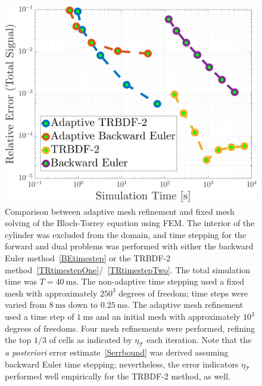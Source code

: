 \documentclass[twocolumn,twoside]{article}
\begin{document}
\clearpage
\begin{figure}[H]
\centering
\begin{minipage}{1.0\textwidth}
    \centering
    \includegraphics[keepaspectratio=true,width=1.0\textwidth]{figures/CompareAdaptiveFEM}
    \caption{Comparison between adaptive mesh refinement and fixed mesh solving of the Bloch-Torrey equation using FEM.
    The interior of the cylinder was excluded from the domain, and time stepping for the forward and dual problems was performed with either the backward Euler method~\eqref{BEtimestep} or the \textsc{TRBDF-2} method~\eqref{TRtimestepOne}/~\eqref{TRtimestepTwo}.
    The total simulation time was $T=\SI{40}{\milli\second}$.
    The non-adaptive time stepping used a fixed mesh with approximately $250^3$ degrees of freedom; time steps were varied from $\SI{8}{\milli\second}$ down to $\SI{0.25}{\milli\second}$.
    The adaptive mesh refinement used a time step of $\SI{1}{\milli\second}$ and an initial mesh with approximately $10^3$ degrees of freedoms.
    Four mesh refinements were performed, refining the top $1/3$ of cells as indicated by $\eta_{\mathcal{T}}$ each iteration.
    Note that the \textit{a posteriori} error estimate~\eqref{Serrbound} was derived assuming backward Euler time stepping; nevertheless, the error indicators $\eta_{\mathcal{T}}$ performed well empirically for the \textsc{TRBDF-2} method, as well.}
    \label{fig:CompareAdaptiveFEM}
\end{minipage}
\end{figure}
\end{document}
